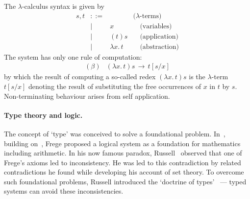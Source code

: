 \documentclass[11pt,twocolumn]{article}
\newcommand{\hide}[1]{}
\newcommand{\lcalculus}{\mbox{$\lambda$-calculus}}
\begin{document}
\hide{
Incidentally, the notion of variable binding was initially introduced much
earlier, by Frege~\cite{Frege1879}, in the context of mathematical logic.  
He used binders to define a formal symbolic
system axiomatising not only the propositional connectives of Boolean
logic~\cite{Boole} but also, for the first time, the quantifiers of
predicate logic.
}

The %
{\lcalculus} syntax is given by
  \[\begin{array}{rcll}
    s , t & ::= & & \mbox{($\lambda$-terms)}\\
      & \mid & x & \quad\mbox{(variables)}\\
      & \mid & (t)s & \quad\mbox{(application)}\\
      & \mid & \lambda x.\,t & \quad\mbox{(abstraction)}
  \end{array}\]
The system has only one rule of computation:
  \begin{equation}\label{BetaReduction}\begin{array}{rl}
(\beta) & (\lambda x.\,t)s \,\longrightarrow\, t[s/x]
  \end{array}\end{equation}
by which the result of computing a so-called redex $(\lambda x.\,t)s$ is
the \mbox{$\lambda$-term} $t[s/x]$ denoting the result of substituting the
free occurrences of $x$ in $t$ by $s$.  Non-terminating behaviour arises from
self application.

\paragraph{Type theory and logic.}
\label{SectionATypeTheoryAndLogicParagraph}

The concept of `type' was conceived to solve a foundational problem.
In~\cite{Frege1903}, building on~\cite{Frege1879}, Frege proposed a logical
system as a foundation for mathematics including arithmetic.  In his now
famous paradox, Russell~\cite{Russell1902} observed that one of Frege's axioms
led to inconsistency.  He was led to this contradiction by related
contradictions he found while developing his account of set theory.  To
overcome such foundational problems, Russell introduced the `doctrine of
types'~\cite[Appendix~B]{Russell1903} --- typed systems can avoid these
inconsistencies.
\end{document}

